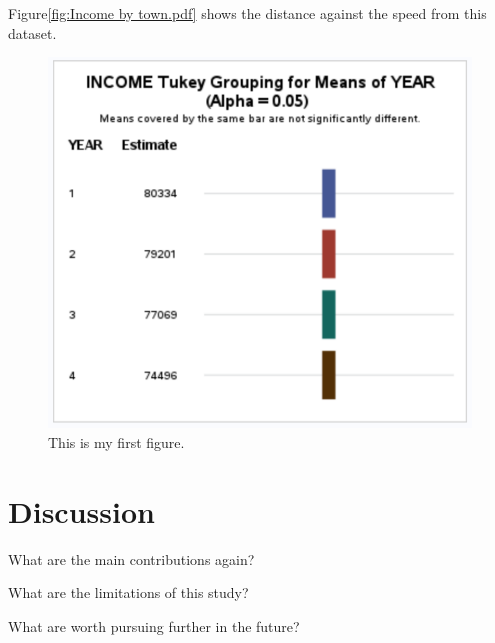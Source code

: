 \documentclass[12pt]{article}
\begin{document}
Figure\ref{fig:Income by town.pdf} shows the distance against the speed from this dataset.
\begin{figure}[tbp]
  \centering
  \includegraphics[width=\textwidth]{Income by year.pdf}
  \caption{This is my first figure.}\label{fig:cars}
\end{figure}

\section{Discussion}\label{sec:disc}

What are the main contributions again?

What are the limitations of this study?

What are worth pursuing further in the future?


\appendix



\end{document}
